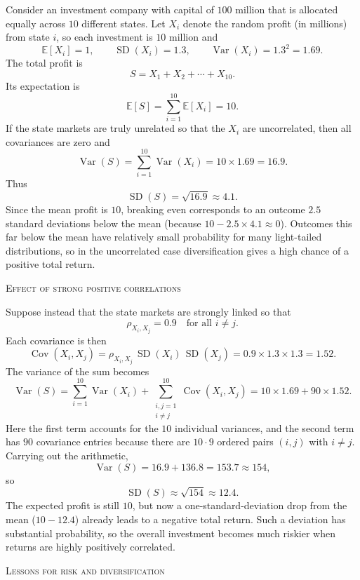 Consider an investment company with capital of \(100\) million that is allocated equally across \(10\) different states.  
Let \(X_i\) denote the random profit (in millions) from state \(i\), so each investment is \(10\) million and
\[
\mathbb{E}[X_i] = 1,
\qquad
\operatorname{SD}(X_i) = 1.3,
\qquad
\operatorname{Var}(X_i) = 1.3^{2} = 1.69.
\]
The total profit is
\[
S = X_1 + X_2 + \cdots + X_{10}.
\]
Its expectation is
\[
\mathbb{E}[S] = \sum_{i=1}^{10} \mathbb{E}[X_i] = 10.
\]
If the state markets are truly unrelated so that the \(X_i\) are uncorrelated, then all covariances are zero and
\[
\operatorname{Var}(S)
=
\sum_{i=1}^{10} \operatorname{Var}(X_i)
=
10 \times 1.69
=
16.9.
\]
Thus
\[
\operatorname{SD}(S) = \sqrt{16.9} \approx 4.1.
\]
Since the mean profit is \(10\), breaking even corresponds to an outcome \(2.5\) standard deviations below the mean (because \(10 - 2.5 \times 4.1 \approx 0\)).  
Outcomes this far below the mean have relatively small probability for many light-tailed distributions, so in the uncorrelated case diversification gives a high chance of a positive total return.

\bigskip
\textsc{Effect of strong positive correlations}

Suppose instead that the state markets are strongly linked so that
\[
\rho_{X_i,X_j} = 0.9
\quad\text{for all } i\ne j.
\]
Each covariance is then
\[
\operatorname{Cov}(X_i,X_j)
=
\rho_{X_i,X_j}\,\operatorname{SD}(X_i)\,\operatorname{SD}(X_j)
=
0.9 \times 1.3 \times 1.3
=
1.52.
\]
The variance of the sum becomes
\[
\operatorname{Var}(S)
=
\sum_{i=1}^{10}\operatorname{Var}(X_i)
+
\sum_{\substack{i,j=1\\ i\ne j}}^{10}\operatorname{Cov}(X_i,X_j)
=
10 \times 1.69
+
90 \times 1.52.
\]
Here the first term accounts for the \(10\) individual variances, and the second term has \(90\) covariance entries because there are \(10\cdot 9\) ordered pairs \((i,j)\) with \(i\ne j\).  
Carrying out the arithmetic,
\[
\operatorname{Var}(S)
=
16.9 + 136.8
=
153.7 \approx 154,
\]
so
\[
\operatorname{SD}(S)
\approx
\sqrt{154}
\approx
12.4.
\]
The expected profit is still \(10\), but now a one-standard-deviation drop from the mean (\(10-12.4\)) already leads to a negative total return.  
Such a deviation has substantial probability, so the overall investment becomes much riskier when returns are highly positively correlated.

\bigskip
\textsc{Lessons for risk and diversification}

